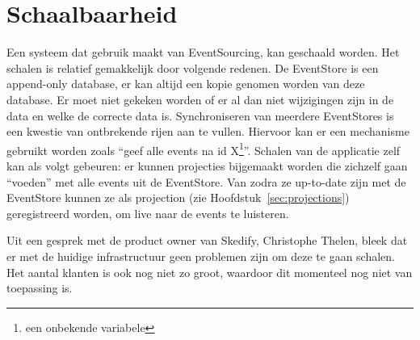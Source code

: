 
\chapter{Schaalbaarheid}
\label{ch:schaalbaarheid}

Een systeem dat gebruik maakt van EventSourcing, kan geschaald worden. Het schalen is relatief gemakkelijk door volgende redenen.
De EventStore is een append-only database, er kan altijd een kopie genomen worden van deze database. Er moet niet gekeken worden of er al dan niet wijzigingen zijn in de data en welke de correcte data is. Synchroniseren van meerdere EventStores is een kwestie van ontbrekende rijen aan te vullen. Hiervoor kan er een mechanisme gebruikt worden zoals ``geef alle events na id X\footnote{een onbekende variabele}''.
Schalen van de applicatie zelf kan als volgt gebeuren: er kunnen projecties bijgemaakt worden die zichzelf gaan ``voeden'' met alle events uit de EventStore. Van zodra ze up-to-date zijn met de EventStore kunnen ze als projection (zie Hoofdstuk~\ref{sec:projections}) geregistreerd worden, om live naar de events te luisteren.

Uit een gesprek met de product owner van Skedify, Christophe Thelen, bleek dat er met de huidige infrastructuur geen problemen zijn om deze te gaan schalen. Het aantal klanten is ook nog niet zo groot, waardoor dit momenteel nog niet van toepassing is.
